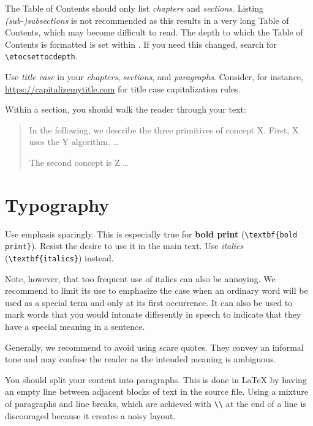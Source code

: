 The Table of Contents should only list \emph{chapters} and \emph{sections}. Listing \emph{(sub-)subsections} is not recommended as this results in a very long Table of Contents, which may become difficult to read. The depth to which the Table of Contents is formatted is set within . If you need this changed, search for \texttt{\textbackslash etocsettocdepth}.

Use \emph{title case} in your \emph{chapters}, \emph{sections}, and \emph{paragraphs}. Consider, for instance, \url{https://capitalizemytitle.com} for title case capitalization rules.

Within a section, you should walk the reader through your text:
\begin{quote}
In the following, we describe the three primitives of concept X. First, X uses the Y algorithm. …

The second concept is Z …
\end{quote}

\section{Typography}

Use emphasis sparingly. This is especially true for \textbf{bold print} (\verb|\textbf{bold print}|). Resist the desire to use it in the main text. Use \emph{italics} (\verb|\textbf{italics}|) instead.

 Note, however, that too frequent use of italics can also be annoying. We recommend to limit its use to emphasize the case when an ordinary word will be used as a special term and only at its first occurrence. It can also be used to mark words that you would intonate differently in speech to indicate that they have a special meaning in a sentence.

Generally, we recommend to avoid using scare quotes. They convey an informal tone and may confuse the reader as the intended meaning is ambiguous.

You should split your content into paragraphs. This is done in LaTeX by having an empty line between adjacent blocks of text in the source file. Using a mixture of paragraphs and line breaks, which are achieved with \verb|\\| at the end of a line is discouraged because it creates a noisy layout.

